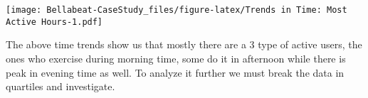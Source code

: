 \documentclass[
]{article}
\newenvironment{Shaded}{\begin{snugshade}}{\end{snugshade}}
\newcommand{\AttributeTok}[1]{\textcolor[rgb]{0.77,0.63,0.00}{#1}}
\newcommand{\DecValTok}[1]{\textcolor[rgb]{0.00,0.00,0.81}{#1}}
\newcommand{\FunctionTok}[1]{\textcolor[rgb]{0.00,0.00,0.00}{#1}}
\newcommand{\NormalTok}[1]{#1}
\newcommand{\OtherTok}[1]{\textcolor[rgb]{0.56,0.35,0.01}{#1}}
\newcommand{\SpecialCharTok}[1]{\textcolor[rgb]{0.00,0.00,0.00}{#1}}
\newcommand{\StringTok}[1]{\textcolor[rgb]{0.31,0.60,0.02}{#1}}
\begin{document}
\texttt{[image: Bellabeat-CaseStudy\_files/figure-latex/Trends in Time: Most Active Hours-1.pdf]}

The above time trends show us that mostly there are a 3 type of active
users, the ones who exercise during morning time, some do it in
afternoon while there is peak in evening time as well. To analyze it
further we must break the data in quartiles and investigate.\\
\strut \\

\begin{Shaded}
\end{Shaded}
\end{document}
